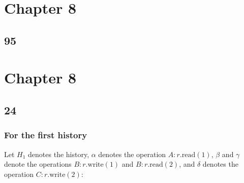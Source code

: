 \documentclass[]{article}
\begin{document}
\section*{Chapter 8}

\subsection{95}





\section*{Chapter 8}
\subsection{24}
\subsubsection*{For the first history}

Let $H_1$ denotes the history, $\alpha$ denotes the
operation $A:r.\mathrm{read}(1)$, $\beta$ and $\gamma$ denote the operations
$B:r.\mathrm{write}(1)$ and $B:r.\mathrm{read}(2)$, and $\delta$ denotes the
operation $C:r.\mathrm{write}(2)$:
\end{document}

